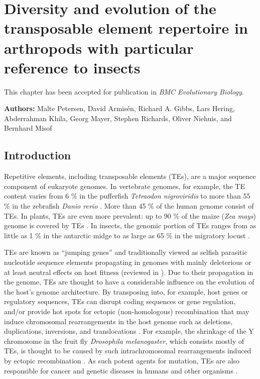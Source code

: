 
\chapter{Diversity and evolution of the transposable element repertoire
in arthropods with particular reference to insects} \label{cha:mobilome}

\newpage

This chapter has been accepted for publication in \emph{BMC Evolutionary
Biology}.

\noindent \textbf{Authors:} Malte Petersen, David Armisén, Richard A.
Gibbs, Lars Hering, Abderrahman Khila, Georg Mayer, Stephen Richards,
Oliver Niehuis, and Bernhard Misof

\section{Introduction}

Repetitive elements, including transposable elements (TEs), are a major
sequence component of eukaryote genomes. In vertebrate genomes, for
example, the TE content varies from 6 \% in the pufferfish
\emph{Tetraodon nigroviridis} to more than 55 \% in the zebrafish
\emph{Danio rerio} \citep{Chalopin2015}. More than 45 \% of the human
genome \citep{deKoning2011} consist of TEs. In plants, TEs are even more
prevalent: up to 90 \% of the maize (\emph{Zea mays}) genome is covered
by TEs \citep{SanMiguel1996}. In insects, the genomic portion of TEs
ranges from as little as 1 \% in the antarctic midge \citep{Kelley2014}
to as large as 65 \% in the migratory locust \citep{Wang2014}.

TEs are known as ``jumping genes'' and traditionally viewed as selfish
parasitic nucleotide sequence elements propagating in genomes with
mainly deleterious or at least neutral effects on host fitness
\citep{Mackay1989, Pasyukova2004} (reviewed in \citet{Barron2014}). Due
to their propagation in the genome, TEs are thought to have a
considerable influence on the evolution of the host's genome
architecture. By transposing into, for example, host genes or regulatory
sequences, TEs can disrupt coding sequences or gene regulation, and/or
provide hot spots for ectopic (non-homologous) recombination that may
induce chromosomal rearrangements in the host genome such as deletions,
duplications, inversions, and translocations \citep{Burns2012}. For
example, the shrinkage of the Y chromosome in the fruit fly
\emph{Drosophila melanogaster}, which consists mostly of TEs, is thought
to be caused by such intrachromosomal rearrangements induced by ectopic
recombination \citep{Adams2000, Kent2017}. As such potent agents for
mutation, TEs are also responsible for cancer and genetic diseases in
humans and other organisms
\citep{Vorechovsky2009,Chenais2015,Hancks2016}.

